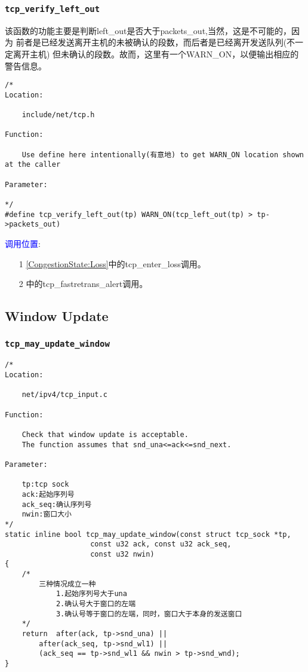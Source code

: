         \subsubsection{\texttt{tcp_verify_left_out}}
            \label{WindowCompute:tcp_verify_left_out}
            该函数的功能主要是判断left\_out是否大于packets\_out,当然，这是不可能的，因为
            前者是已经发送离开主机的未被确认的段数，而后者是已经离开发送队列(不一定离开主机)
            但未确认的段数。故而，这里有一个WARN\_ON，以便输出相应的警告信息。
\begin{verbatim}
/* 
Location:

    include/net/tcp.h

Function:

    Use define here intentionally(有意地) to get WARN_ON location shown at the caller 

Parameter:

*/
#define tcp_verify_left_out(tp) WARN_ON(tcp_left_out(tp) > tp->packets_out)     
\end{verbatim}


        \textcolor{blue}{调用位置}:

            \begin{enumerate}
                \item[1]        \ref{CongestionState:Loss}中的tcp\_enter\_loss调用。
                \item[2]        \label{CongestionDeal:tcp_fastretrans_alert}中的tcp\_fastretrans\_alert调用。
            \end{enumerate}
    \subsection{Window Update}
        \subsubsection{\texttt{tcp_may_update_window}}
            \label{WindowUpdate:tcp_may_update_window}
\begin{verbatim}
/* 
Location:

    net/ipv4/tcp_input.c

Function:

    Check that window update is acceptable.
    The function assumes that snd_una<=ack<=snd_next.

Parameter:

    tp:tcp sock
    ack:起始序列号
    ack_seq:确认序列号
    nwin:窗口大小
*/
static inline bool tcp_may_update_window(const struct tcp_sock *tp,
                    const u32 ack, const u32 ack_seq,
                    const u32 nwin)
{
    /*
        三种情况成立一种
            1.起始序列号大于una
            2.确认号大于窗口的左端
            3.确认号等于窗口的左端，同时，窗口大于本身的发送窗口
    */
    return  after(ack, tp->snd_una) ||
        after(ack_seq, tp->snd_wl1) ||
        (ack_seq == tp->snd_wl1 && nwin > tp->snd_wnd);
}
\end{verbatim}
